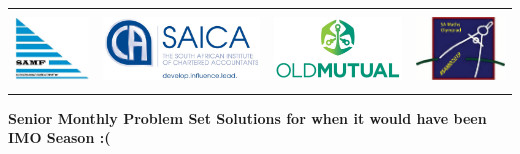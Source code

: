 \documentclass{article}
\begin{document}
\setlength{\tabcolsep}{6pt}
\begin{center} \begin{tabular}{cccc}
	\includegraphics[height=56pt]{SAMF_logo.jpg} &
	\includegraphics[height=56pt]{SAICA_logo.jpg} &
	\includegraphics[height=56pt]{OM_Logo_Stacked_Vignette_on_White_RGB.jpg} &
	\includegraphics[height=56pt]{SAMO2019.png}
\end{tabular} \end{center}


\bigskip


\begin{center}
	\textbf{\Large Senior Monthly Problem Set Solutions for when it would have been IMO Season :(}
\end{center}
\end{document}
